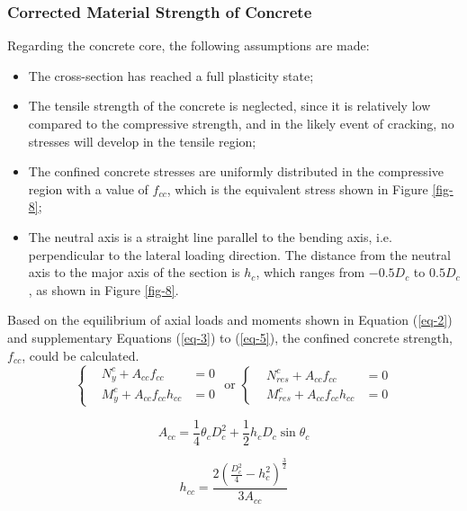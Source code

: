 \documentclass[12pt,a4]{article}
\begin{document}
	\subsubsection{Corrected Material Strength of Concrete}
	Regarding the concrete core, the following assumptions are made:
	\begin{itemize}
		\item The cross-section has reached a full plasticity state;
		
		\item The tensile strength of the concrete is neglected, since it is relatively low compared to the compressive strength, and in the likely event of cracking, no stresses will develop in the tensile region;
		
		\item The confined concrete stresses are uniformly distributed in the compressive region with a value of $f_{cc}$, which is the equivalent stress shown in Figure \ref{fig-8};
		
		\item The neutral axis is a straight line parallel to the bending axis, i.e. perpendicular to the lateral loading direction. The distance from the neutral axis to the major axis of the section is $h_c$, which ranges from $−0.5D_c$ to $0.5D_c$, as shown in Figure \ref{fig-8}.
	\end{itemize}
	Based on the equilibrium of axial loads and moments shown in Equation (\ref{eq-2}) and supplementary Equations (\ref{eq-3}) to (\ref{eq-5}), the confined concrete strength, $f_{cc}$, could be calculated.
	\begin{equation}\label{eq-2}
	\left\{
	\begin{aligned}
	&N_y^c + A_{cc}f_{cc}  & = 0\\
	&M_y^c + A_{cc}f_{cc}h_{cc} & = 0
	\end{aligned}
	\right.
	\textrm{ or }
	\left\{
	\begin{aligned}
	&N_{res}^c + A_{cc}f_{cc} & = 0\\
	&M_{res}^c + A_{cc}f_{cc}h_{cc} & = 0
	\end{aligned}
	\right.
	\end{equation}
	
	\begin{equation}\label{eq-3}
	A_{cc} = \frac{1}{4}\theta_{c}D_{c}^2 + \dfrac{1}{2}h_cD_c\sin\theta_c
	\end{equation}
	
	\begin{equation}\label{eq-4}
	h_{cc} = \frac{2(\frac{D_c^2}{4} - h_c^2)^\frac{3}{2}}{3A_{cc}}
	\end{equation}
	
\end{document}
